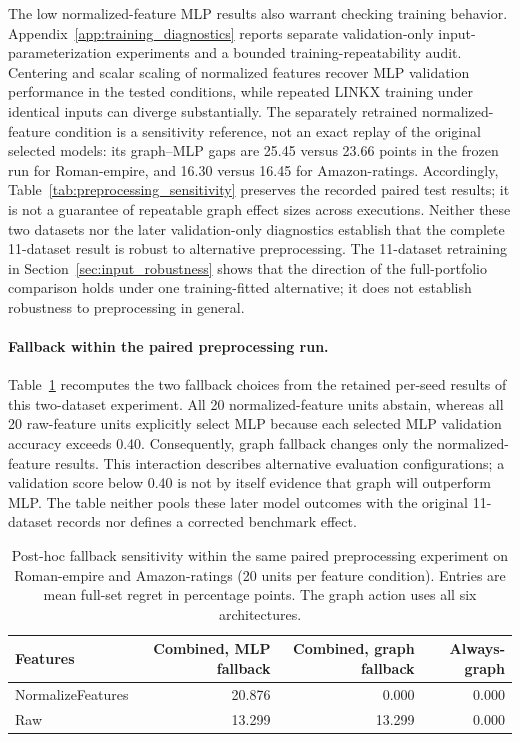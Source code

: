 The low normalized-feature MLP results also warrant checking training behavior. Appendix~\ref{app:training_diagnostics} reports separate validation-only input-parameterization experiments and a bounded training-repeatability audit. Centering and scalar scaling of normalized features recover MLP validation performance in the tested conditions, while repeated LINKX training under identical inputs can diverge substantially. The separately retrained normalized-feature condition is a sensitivity reference, not an exact replay of the original selected models: its graph--MLP gaps are 25.45 versus 23.66 points in the frozen run for Roman-empire, and 16.30 versus 16.45 for Amazon-ratings. Accordingly, Table~\ref{tab:preprocessing_sensitivity} preserves the recorded paired test results; it is not a guarantee of repeatable graph effect sizes across executions. Neither these two datasets nor the later validation-only diagnostics establish that the complete 11-dataset result is robust to alternative preprocessing. The 11-dataset retraining in Section~\ref{sec:input_robustness} shows that the direction of the full-portfolio comparison holds under one training-fitted alternative; it does not establish robustness to preprocessing in general.

\paragraph{Fallback within the paired preprocessing run.}
Table~\ref{tab:preprocessing_fallback} recomputes the two fallback choices from the retained per-seed results of this two-dataset experiment. All 20 normalized-feature units abstain, whereas all 20 raw-feature units explicitly select MLP because each selected MLP validation accuracy exceeds 0.40. Consequently, graph fallback changes only the normalized-feature results. This interaction describes alternative evaluation configurations; a validation score below 0.40 is not by itself evidence that graph will outperform MLP. The table neither pools these later model outcomes with the original 11-dataset records nor defines a corrected benchmark effect.

\begin{table}[ht]
\centering
\caption{Post-hoc fallback sensitivity within the same paired preprocessing experiment on Roman-empire and Amazon-ratings (20 units per feature condition). Entries are mean full-set regret in percentage points. The graph action uses all six architectures.}
\label{tab:preprocessing_fallback}
\small
\begin{tabular}{@{}lrrr@{}}
\toprule
Features & Combined, MLP fallback & Combined, graph fallback & Always-graph \\
\midrule
NormalizeFeatures & 20.876 & 0.000 & 0.000 \\
Raw & 13.299 & 13.299 & 0.000 \\
\bottomrule
\end{tabular}
\end{table}

